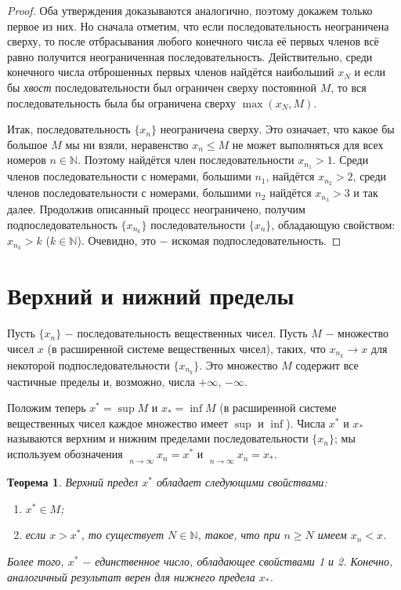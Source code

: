 \documentclass{article}
\newtheorem{theorem}{Теорема}[section]
\DeclareMathOperator*\lowlim{\underline{lim}}
\DeclareMathOperator*\uplim{\overline{lim}}
\begin{document}
\begin{proof}
Оба утверждения доказываются аналогично, поэтому докажем только первое из них. Но сначала отметим, что если последовательность неограничена сверху, то после отбрасывания любого конечного числа её первых членов всё равно получится неограниченная последовательность. Действительно, среди конечного числа отброшенных первых членов найдётся наибольший \(x_N\) и если бы \textit{хвост} последовательности был ограничен сверху постоянной \(M\), то вся последовательность была бы ограничена сверху \(\max(x_N, M)\).

Итак, последовательность \(\{x_n\}\) неограничена сверху. Это означает, что какое бы большое \(M\) мы ни взяли, неравенство \(x_n \leq M\) не может выполняться для всех номеров \(n \in \mathbb{N}\). Поэтому найдётся член последовательности \(x_{n_1} > 1\). Среди членов последовательности с номерами, большими \(n_1\), найдётся \(x_{n_2} > 2\), среди членов последовательности с номерами, большими \(n_2\) найдётся \(x_{n_3} > 3\) и так далее. Продолжив описанный процесс неограничено, получим подпоследовательность \(\{x_{n_k}\}\) последовательности \(\{x_n\}\), обладающую свойством: \(x_{n_k} > k\) (\(k \in \mathbb{N}\)). Очевидно, это \(-\) искомая подпоследовательность.
\end{proof}

\section{Верхний и нижний пределы}

Пусть \(\{x_n\}\) \(-\) последовательность вещественных чисел. Пусть \(M\) \(-\) множество чисел \(x\) (в расширенной системе вещественных чисел), таких, что \(x_{n_k} \to x\) для некоторой подпоследовательности \(\{x_{n_k}\}\). Это множество \(M\) содержит все частичные пределы и, возможно, числа \(+ \infty\), \(- \infty\).

Положим теперь \(x^{*} = \sup M\) и \(x_{*} = \inf M\) (в расширенной системе вещественных чисел каждое множество имеет \(\sup\) и \(\inf\)). Числа \(x^{*}\) и \(x_{*}\) называются верхним и нижним пределами последовательности \(\{x_n\}\); мы используем обозначения \(\uplim\limits_{n \to \infty}{x_n} = x^{*}\) и \(\lowlim\limits_{n \to \infty}{x_n} = x_{*}\).

\newpage

\begin{theorem}
Верхний предел \(x^{*}\) обладает следующими свойствами:
\begin{enumerate}
  \item \(x^{*} \in M\);
  \item если \(x > x^{*}\), то существует \(N \in \mathbb{N}\), такое, что при \(n \geq N\) имеем \(x_n < x\).
\end{enumerate}
Более того, \(x^{*}\) \(-\) единственное число, обладающее свойствами \textit{1} и \textit{2}. Конечно, аналогичный результат верен для нижнего предела \(x_{*}\).
\end{theorem}
\end{document}

